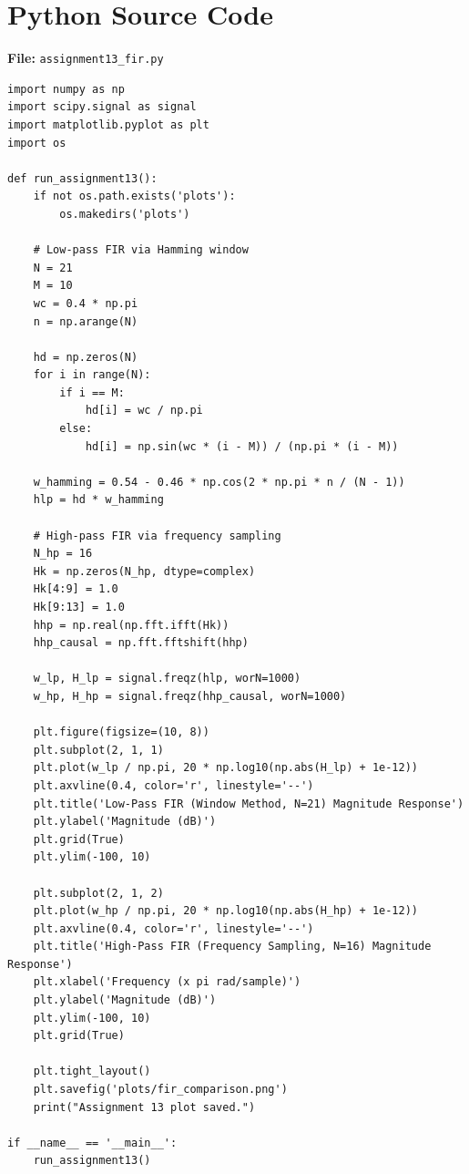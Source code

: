 \documentclass[11pt, a4paper]{article}
\begin{document}
\section{Python Source Code}
\textbf{File:} \texttt{assignment13\_fir.py}
\begin{lstlisting}[caption={FIR Filter Design: Window Method and Frequency Sampling -- Assignment 13}]
import numpy as np
import scipy.signal as signal
import matplotlib.pyplot as plt
import os

def run_assignment13():
    if not os.path.exists('plots'):
        os.makedirs('plots')

    # Low-pass FIR via Hamming window
    N = 21
    M = 10
    wc = 0.4 * np.pi
    n = np.arange(N)

    hd = np.zeros(N)
    for i in range(N):
        if i == M:
            hd[i] = wc / np.pi
        else:
            hd[i] = np.sin(wc * (i - M)) / (np.pi * (i - M))

    w_hamming = 0.54 - 0.46 * np.cos(2 * np.pi * n / (N - 1))
    hlp = hd * w_hamming

    # High-pass FIR via frequency sampling
    N_hp = 16
    Hk = np.zeros(N_hp, dtype=complex)
    Hk[4:9] = 1.0
    Hk[9:13] = 1.0
    hhp = np.real(np.fft.ifft(Hk))
    hhp_causal = np.fft.fftshift(hhp)

    w_lp, H_lp = signal.freqz(hlp, worN=1000)
    w_hp, H_hp = signal.freqz(hhp_causal, worN=1000)

    plt.figure(figsize=(10, 8))
    plt.subplot(2, 1, 1)
    plt.plot(w_lp / np.pi, 20 * np.log10(np.abs(H_lp) + 1e-12))
    plt.axvline(0.4, color='r', linestyle='--')
    plt.title('Low-Pass FIR (Window Method, N=21) Magnitude Response')
    plt.ylabel('Magnitude (dB)')
    plt.grid(True)
    plt.ylim(-100, 10)

    plt.subplot(2, 1, 2)
    plt.plot(w_hp / np.pi, 20 * np.log10(np.abs(H_hp) + 1e-12))
    plt.axvline(0.4, color='r', linestyle='--')
    plt.title('High-Pass FIR (Frequency Sampling, N=16) Magnitude Response')
    plt.xlabel('Frequency (x pi rad/sample)')
    plt.ylabel('Magnitude (dB)')
    plt.ylim(-100, 10)
    plt.grid(True)

    plt.tight_layout()
    plt.savefig('plots/fir_comparison.png')
    print("Assignment 13 plot saved.")

if __name__ == '__main__':
    run_assignment13()
\end{lstlisting}
\end{document}
